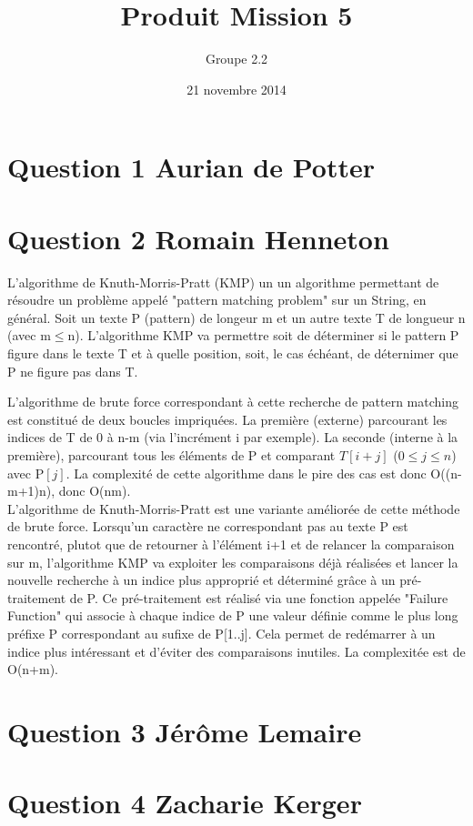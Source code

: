 \documentclass[10pt,a4paper]{article}
\date{21 novembre 2014}
\author{Groupe 2.2}
\title{Produit Mission 5}
\begin{document}
\maketitle

\section*{Question 1 Aurian de Potter}
\section*{Question 2 Romain Henneton}
L'algorithme de Knuth-Morris-Pratt (KMP) un un algorithme permettant de résoudre un problème appelé "pattern matching problem" sur un String, en général. Soit un texte P (pattern) de longeur m et un autre texte T de longueur n (avec m$\leq$n). L'algorithme KMP va permettre soit de déterminer si le pattern P figure dans le texte T et à quelle position, soit, le cas échéant, de déternimer que P ne figure pas dans T.



L'algorithme de brute force correspondant à cette recherche de pattern matching est constitué de deux boucles impriquées. La première (externe) parcourant les indices de T de 0 à n-m (via l'incrément i par exemple). La seconde (interne à la première), parcourant tous les éléments de P et comparant $T[i+j]$ ($0\leq j\leq n$) avec P$[j]$. La complexité de cette algorithme dans le pire des cas est donc O((n-m+1)n), donc O(nm).\\
L'algorithme de Knuth-Morris-Pratt est une variante améliorée de cette méthode de brute force. Lorsqu'un caractère ne correspondant pas au texte P est rencontré, plutot que de retourner à l'élément i+1 et de relancer la comparaison sur m, l'algorithme KMP va exploiter les comparaisons déjà réalisées et lancer la nouvelle recherche à un indice plus approprié et déterminé grâce à un pré-traitement de P. Ce pré-traitement est réalisé via une fonction appelée "Failure Function" qui associe à chaque indice de P une valeur définie comme le plus long préfixe P correspondant au sufixe de P[1..j]. Cela permet de redémarrer à un indice plus intéressant et d'éviter des comparaisons inutiles. La complexitée  est de O(n+m).
\section*{Question 3 Jérôme Lemaire}

\section*{Question 4 Zacharie Kerger}
\end{document}
